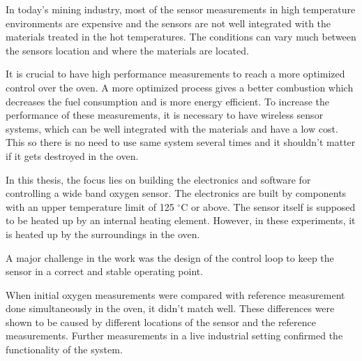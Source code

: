 

In today's mining industry, most of the sensor measurements in high temperature environments are expensive and the sensors are not well integrated with the materials treated in the hot temperatures. The conditions can vary much between the sensors location and where the materials are located. 



It is crucial to have high performance measurements to reach a more optimized control over the oven. A more optimized process gives a better combustion which decreases the fuel consumption and is more energy efficient. To increase the performance of these measurements, it is necessary to have wireless sensor systems, which can be well integrated with the materials and have a low cost. This so there is no need to use same system several times and it shouldn't matter if it gets destroyed in the oven.

In this thesis, the focus lies on building the electronics and software for controlling a wide band oxygen sensor. The electronics are built by components with an upper temperature limit of 125 $^\circ$C or above. The sensor itself is supposed to be heated up by an internal heating element. However, in these experiments, it is heated up by the surroundings in the oven.

A major challenge in the work was the design of the control loop to keep the sensor in a correct and stable operating point.

When initial oxygen measurements were compared with reference measurement done simultaneously in the oven, it didn't match well. These differences were shown to be caused by different locations of the sensor and the reference measurements. Further measurements in a live industrial setting confirmed the functionality of the system.

